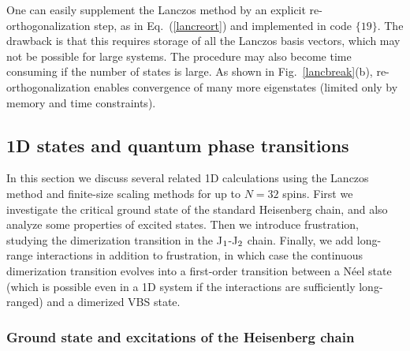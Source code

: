 \documentclass[draft,numberedheadings]{aipproc}
\begin{document}
One can easily supplement the Lanczos method by an explicit re-ortho\-gonalization step, as in Eq.~(\ref{lancreort}) and implemented in code $\{19\}$.
The drawback is that this requires storage of all the Lanczos basis vectors, which may not be possible for large systems. The procedure may also become
time consuming if the number of states is large. As shown in Fig.~\ref{lancbreak}(b), re-orthogonalization enables convergence of many more eigenstates 
(limited only by memory and time constraints).

\subsection{1D states and quantum phase transitions}
\label{sec_results1d}

In this section we discuss several related 1D calculations using the Lanczos method and finite-size scaling methods for up to $N=32$ spins.
First we investigate the critical ground state of the standard Heisenberg chain, and also analyze some properties of excited states. Then we introduce 
frustration, studying the dimerization transition in the J$_{\rm 1}$-J$_{\rm 2}$ chain. Finally, we add long-range interactions in addition to frustration, 
in which case the continuous dimerization transition evolves into a first-order transition between a N\'eel state (which is possible even in a 1D system 
if the interactions are sufficiently long-ranged) and a dimerized VBS state.

\subsubsection{Ground state and excitations of the Heisenberg chain}
\label{sec_hchain}
\end{document}
